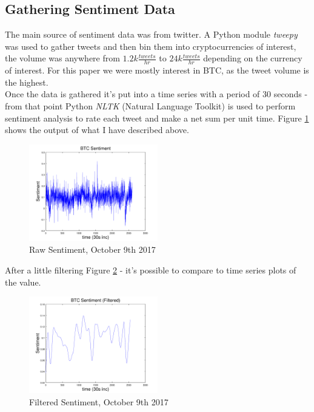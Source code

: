 \documentclass[12pt,journal,compsoc]{IEEEtran}
\begin{document}
\subsection{Gathering Sentiment Data}
The main source of sentiment data was from twitter. A Python module \textit{tweepy} was used to gather
tweets and then bin them into cryptocurrencies of interest, the volume was anywhere from $1.2k \frac{tweets}{hr}$
to $24k \frac{tweets}{hr}$ depending on the currency of interest. For this paper we were mostly interest in BTC, as the
tweet volume is the highest.\\

Once the data is gathered it's put into a time series with a period of 30 seconds - from that point Python \textit{NLTK} 
(Natural Language Toolkit) is used to perform sentiment analysis to rate each tweet and make a net sum per unit time. 
Figure \ref{fig:RawSent} shows the output of what I have described above.

\begin{figure}[hp]
	\centering
	\includegraphics[width=0.5\textwidth]{../Datasets/Plots/Oct9_Sen}
	\caption{Raw Sentiment, October 9th 2017}
	\label{fig:RawSent}
\end{figure}

After a little filtering Figure \ref{fig:FilteredSent} - it's possible to compare to time series plots of the value.

\begin{figure}[h]
	\centering
	\includegraphics[width=0.5\textwidth]{../Datasets/Plots/Oct9_Sen_Fil}
	\caption{Filtered Sentiment, October 9th 2017}
	\label{fig:FilteredSent}
\end{figure}
\end{document}
